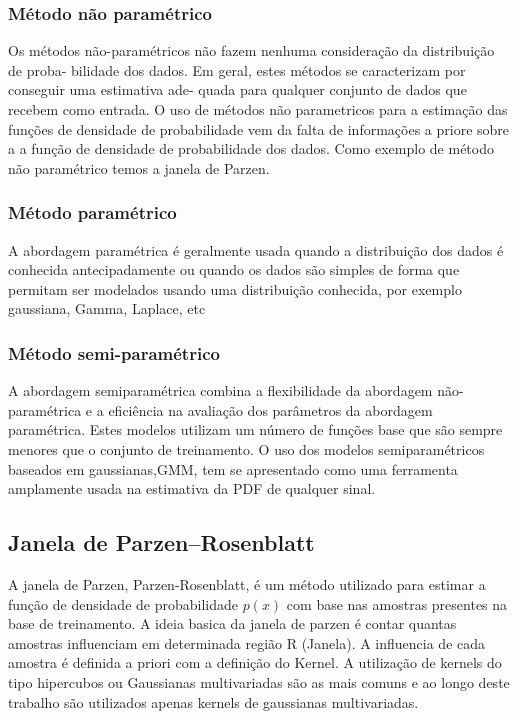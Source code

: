 \documentclass[ 
	article,			%
	11pt,				%
	oneside,			%
	a4paper,			%
	english,			%
	brazil,				%
	]{abntex2}
\begin{document}
\subsubsection{Método não paramétrico}
Os métodos não-paramétricos não fazem nenhuma consideração da distribuição de
proba- bilidade dos dados. Em geral, estes métodos se caracterizam por conseguir
uma estimativa ade- quada para qualquer conjunto de dados que recebem como
entrada. O uso de métodos não parametricos para a estimação das funções de
densidade de probabilidade vem da falta de informações a priore sobre a a função
de densidade de probabilidade dos dados. Como exemplo de método não paramétrico
temos a janela de Parzen.




\subsubsection{Método paramétrico}
A abordagem paramétrica é geralmente usada quando a distribuição dos dados é
conhecida antecipadamente ou quando os dados são simples de forma que permitam
ser modelados usando uma distribuição conhecida, por exemplo gaussiana, Gamma,
Laplace, etc

\subsubsection{Método semi-paramétrico}
A abordagem semiparamétrica  combina a flexibilidade da abordagem
não-paramétrica e a eficiência na avaliação dos parâmetros da abordagem
paramétrica. Estes modelos utilizam um número de funções base que são sempre
menores que o conjunto de treinamento. O uso dos modelos semiparamétricos
baseados em gaussianas,GMM, tem se apresentado como uma ferramenta amplamente
usada na estimativa da PDF de qualquer sinal.

\subsection{Janela de Parzen–Rosenblatt }
A janela de Parzen, Parzen-Rosenblatt, é um método utilizado para estimar a
função de densidade de probabilidade $p(x)$ com base nas amostras presentes na
base de treinamento. A ideia basica da janela de parzen é contar quantas
amostras influenciam em determinada região R (Janela). A influencia de cada
amostra é definida a priori com a definição do Kernel. A utilização de kernels
do tipo hipercubos ou Gaussianas multivariadas são as mais comuns e ao longo
deste trabalho são utilizados apenas kernels de gaussianas multivariadas.
\end{document}
